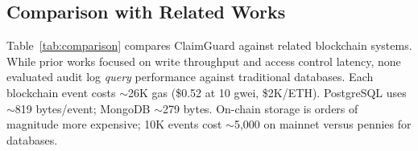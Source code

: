 \documentclass[conference]{IEEEtran}
\begin{document}
\subsection{Comparison with Related Works}
Table~\ref{tab:comparison} compares ClaimGuard against related blockchain systems. While prior works focused on write throughput and access control latency, none evaluated audit log \textit{query} performance against traditional databases. Each blockchain event costs $\sim$26K gas (\$0.52 at 10 gwei, \$2K/ETH). PostgreSQL uses $\sim$819 bytes/event; MongoDB $\sim$279 bytes. On-chain storage is orders of magnitude more expensive; 10K events cost $\sim$5,000 on mainnet versus pennies for databases.
\begin{table}[!htbp]
	\centering
	\caption{Performance Comparison with Related Works}
	\label{tab:comparison}
\end{table}
\end{document}
